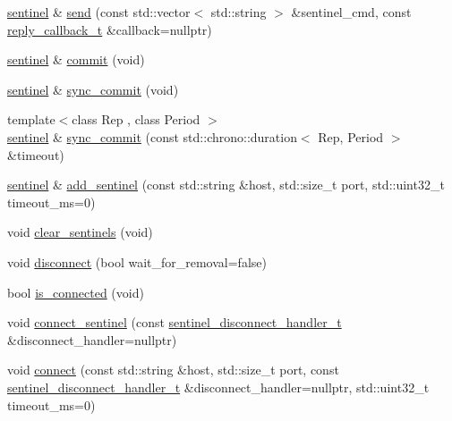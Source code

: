 \begin{DoxyCompactItemize}
\mbox{\hyperlink{classcpp__redis_1_1sentinel}{sentinel}} \& \mbox{\hyperlink{classcpp__redis_1_1sentinel_a0df522dbd7debda4e73f616a62d6f5ee}{send}} (const std\+::vector$<$ std\+::string $>$ \&sentinel\+\_\+cmd, const \mbox{\hyperlink{classcpp__redis_1_1sentinel_ae1a150ff8787208c47414397a061c9a7}{reply\+\_\+callback\+\_\+t}} \&callback=nullptr)
\item 
\mbox{\hyperlink{classcpp__redis_1_1sentinel}{sentinel}} \& \mbox{\hyperlink{classcpp__redis_1_1sentinel_ad4f85d486499f82225b244f85091b31e}{commit}} (void)
\item 
\mbox{\hyperlink{classcpp__redis_1_1sentinel}{sentinel}} \& \mbox{\hyperlink{classcpp__redis_1_1sentinel_a8e4d231ac89510c337fe97fe9e642785}{sync\+\_\+commit}} (void)
\item 
{\footnotesize template$<$class Rep , class Period $>$ }\\\mbox{\hyperlink{classcpp__redis_1_1sentinel}{sentinel}} \& \mbox{\hyperlink{classcpp__redis_1_1sentinel_afbaa0b80266f70ad98c0bf8f28c533ab}{sync\+\_\+commit}} (const std\+::chrono\+::duration$<$ Rep, Period $>$ \&timeout)
\item 
\mbox{\hyperlink{classcpp__redis_1_1sentinel}{sentinel}} \& \mbox{\hyperlink{classcpp__redis_1_1sentinel_a6c846b71478c330d2cad7aa662dfd681}{add\+\_\+sentinel}} (const std\+::string \&host, std\+::size\+\_\+t port, std\+::uint32\+\_\+t timeout\+\_\+ms=0)
\item 
void \mbox{\hyperlink{classcpp__redis_1_1sentinel_ac36640b3f392970c72f5a513a2d61ac7}{clear\+\_\+sentinels}} (void)
\item 
void \mbox{\hyperlink{classcpp__redis_1_1sentinel_af607d8c5a20ada35daad251f1b1b2f68}{disconnect}} (bool wait\+\_\+for\+\_\+removal=false)
\item 
bool \mbox{\hyperlink{classcpp__redis_1_1sentinel_aa98a0593e6e7c04d8d0dd1f292cdce47}{is\+\_\+connected}} (void)
\item 
void \mbox{\hyperlink{classcpp__redis_1_1sentinel_a82c8cb23efab71ff00cf2277bba91e90}{connect\+\_\+sentinel}} (const \mbox{\hyperlink{classcpp__redis_1_1sentinel_a923e06b5b700c16dffec8a01d2fa9aa4}{sentinel\+\_\+disconnect\+\_\+handler\+\_\+t}} \&disconnect\+\_\+handler=nullptr)
\item 
void \mbox{\hyperlink{classcpp__redis_1_1sentinel_a1dfba8240daf7cfa7502f57957cffbda}{connect}} (const std\+::string \&host, std\+::size\+\_\+t port, const \mbox{\hyperlink{classcpp__redis_1_1sentinel_a923e06b5b700c16dffec8a01d2fa9aa4}{sentinel\+\_\+disconnect\+\_\+handler\+\_\+t}} \&disconnect\+\_\+handler=nullptr, std\+::uint32\+\_\+t timeout\+\_\+ms=0)

\end{DoxyCompactItemize}
